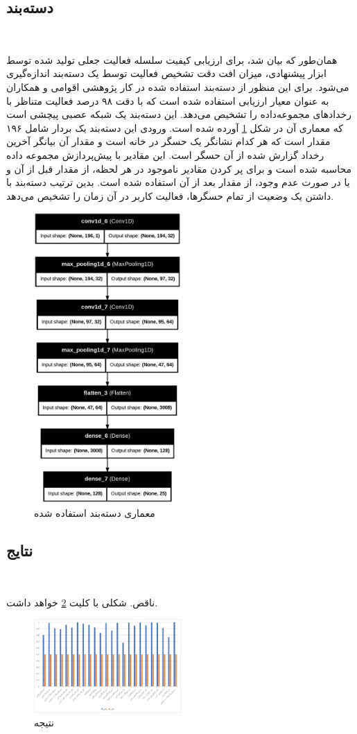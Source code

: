 \subsection{دسته‌بند}‌

همان‌طور که بیان شد، برای ارزیابی کیفیت سلسله فعالیت‌ جعلی تولید شده توسط ابزار پیشنهادی، میزان افت دقت تشخیص فعالیت توسط یک دسته‌بند اندازه‌گیری می‌شود. برای این منظور از دسته‌بند استفاده شده در کار پژوهشی اقوامی و همکاران \cite{x3341} به عنوان معیار ارزیابی استفاده شده است که با دقت ۹۸ درصد فعالیت متناظر با رخدادهای مجموعه‌داده  را تشخیص می‌دهد. این دسته‌بند یک شبکه عصبی پیچشی است که معماری آن در شکل \ref{fig:fO4H5} آورده شده است. ورودی این دسته‌بند یک بردار شامل ۱۹۶ مقدار است که هر کدام نشانگر یک حسگر در خانه است و مقدار آن بیانگر آخرین رخداد گزارش شده از آن حسگر است. این مقادیر با پیش‌پردازش مجموعه داده محاسبه شده است و برای پر کردن مقادیر ناموجود در هر لحظه، از مقدار قبل از آن و یا در صورت عدم وجود، از مقدار بعد از آن استفاده شده است. بدین ترتیب دسته‌بند با داشتن یک وضعیت از تمام حسگرها، فعالیت کاربر در آن زمان را تشخیص می‌دهد.


\begin{figure}[H]
\centerline{\includegraphics[width=0.5\textwidth]{figs/fO4H5.png}}
\caption{معماری دسته‌بند استفاده شده}
\label{fig:fO4H5}
\end{figure}

\subsection{نتایج}‌

ناقص. شکلی با کلیت \ref{fig:fnatijeh} خواهد داشت.

\begin{figure}[H]
\centerline{\includegraphics[width=0.5\textwidth]{figs/fnatijeh.png}}
\caption{نتیجه}
\label{fig:fnatijeh}
\end{figure}


